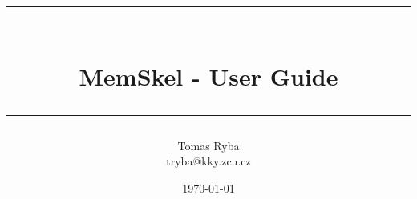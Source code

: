 \documentclass[a4paper,oneside,12pt]{report}
\newcommand{\HRule}{\rule{\linewidth}{0.5mm}}
\begin{document}
\title{\HRule\\
		\vskip 0.5cm
		\textbf{MemSkel - User Guide}\\
		\HRule}
\author{Tomas Ryba\\ tryba@kky.zcu.cz}
\date{\vfill \today}
\maketitle


\end{document}
